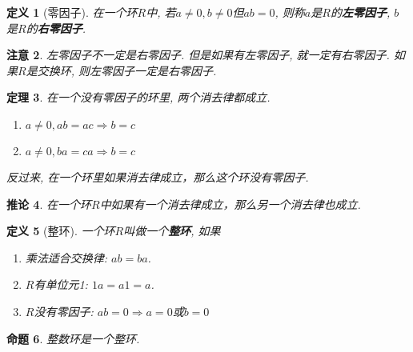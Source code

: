 \documentclass[UTF8]{ctexart}
\newtheorem{Definition}{定义}%
\newtheorem{Theorem}[Definition]{定理}
\newtheorem{Remark}[Definition]{注意}
\newtheorem{Corollary}[Definition]{推论}
\newtheorem{Proposition}[Definition]{命题}
\begin{document}
\begin{Definition}[零因子]
在一个环$R$中, 若$a \neq 0, b \neq 0$但$ab = 0$, 则称$a$是$R$的\textbf{左零因子}, $b$是$R$的\textbf{右零因子}.
\end{Definition}

\begin{Remark}
左零因子不一定是右零因子. 但是如果有左零因子, 就一定有右零因子. 如果$R$是交换环, 则左零因子一定是右零因子.
\end{Remark}

\begin{Theorem}
在一个没有零因子的环里, 两个消去律都成立.
\begin{enumerate}
	\item $a \neq 0, ab = ac \Rightarrow b = c$
	\item $a \neq 0, ba = ca \Rightarrow b = c$
\end{enumerate}
反过来, 在一个环里如果\;\;消去律成立，那么这个环没有零因子.
\end{Theorem}

\begin{Corollary}
在一个环$R$中如果有一个消去律成立，那么另一个消去律也成立.
\end{Corollary}

\begin{Definition}[整环]
一个环$R$叫做一个\textbf{整环}, 如果
\begin{enumerate}
	\item 乘法适合交换律: $ab = ba$.
	\item $R$有单位元1: $1a = a1 = a$.
	\item $R$没有零因子: $ab = 0 \Rightarrow a = 0$或$b = 0$
\end{enumerate}
\end{Definition}

\begin{Proposition}
整数环是一个整环.
\end{Proposition}
\end{document}
